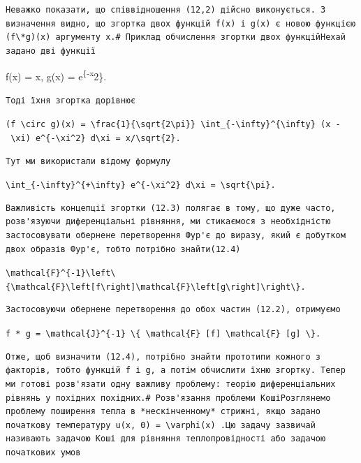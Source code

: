 \documentclass[
  ukrainian,
]{article}
\begin{document}
\begin{verbatim}
Неважко показати, що співвідношення (12,2) дійсно виконується. З визначення видно, що згортка двох функцій f(x) і g(x) є новою функцією (f\*g)(x) аргументу x.# Приклад обчислення згортки двох функційНехай задано дві функції
\end{verbatim}

f(x) = x, g(x) = e\textsuperscript{\{-x}2\}.

\begin{verbatim}
Тоді їхня згортка дорівнює
\end{verbatim}

\texttt{(f\ \textbackslash{}circ\ g)(x)\ =\ \textbackslash{}frac\{1\}\{\textbackslash{}sqrt\{2\textbackslash{}pi\}\}\ \textbackslash{}int\_\{-\textbackslash{}infty\}\^{}\{\textbackslash{}infty\}\ (x\ -\ \textbackslash{}xi)\ e\^{}\{-\textbackslash{}xi\^{}2\}\ d\textbackslash{}xi\ =\ x/\textbackslash{}sqrt\{2\}.}

\begin{verbatim}
Тут ми використали відому формулу
\end{verbatim}

\texttt{\textbackslash{}int\_\{-\textbackslash{}infty\}\^{}\{+\textbackslash{}infty\}\ e\^{}\{-\textbackslash{}xi\^{}2\}\ d\textbackslash{}xi\ =\ \textbackslash{}sqrt\{\textbackslash{}pi\}.}

\begin{verbatim}
Важливість концепції згортки (12.3) полягає в тому, що дуже часто, розв'язуючи диференціальні рівняння, ми стикаємося з необхідністю застосовувати обернене перетворення Фур'є до виразу, який є добутком двох образів Фур'є, тобто потрібно знайти(12.4)
\end{verbatim}

\texttt{\textbackslash{}mathcal\{F\}\^{}\{-1\}\textbackslash{}left\textbackslash{}\{\textbackslash{}mathcal\{F\}\textbackslash{}left{[}f\textbackslash{}right{]}\textbackslash{}mathcal\{F\}\textbackslash{}left{[}g\textbackslash{}right{]}\textbackslash{}right\textbackslash{}\}.}

\begin{verbatim}
Застосовуючи обернене перетворення до обох частин (12.2), отримуємо
\end{verbatim}

\texttt{f\ *\ g\ =\ \textbackslash{}mathcal\{J\}\^{}\{-1\}\ \textbackslash{}\{\ \textbackslash{}mathcal\{F\}\ {[}f{]}\ \textbackslash{}mathcal\{F\}\ {[}g{]}\ \textbackslash{}\}.}

\begin{verbatim}
Отже, щоб визначити (12.4), потрібно знайти прототипи кожного з факторів, тобто функцій f і g, а потім обчислити їхню згортку. Тепер ми готові розв'язати одну важливу проблему: теорію диференціальних рівнянь у похідних похідних.# Розв'язання проблеми КошіРозглянемо проблему поширення тепла в *нескінченному* стрижні, якщо задано початкову температуру u(x, 0) = \varphi(x) .Цю задачу зазвичай називають задачою Коші для рівняння теплопровідності або задачою початкових умов
\end{verbatim}
\end{document}
